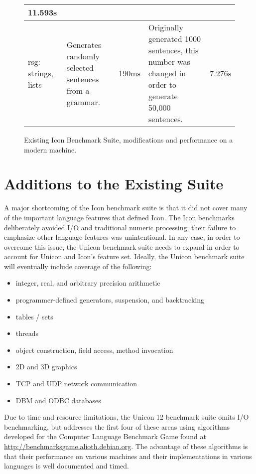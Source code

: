 \documentclass[letterpaper,12pt]{article}
\newcommand{\squeezeup}{\vspace{-1em}}
\begin{document}
\begin{figure}[h]
\begin{center}
{\begin{tabular}{ | p{2cm} | p{4cm} | p{.8cm} | p{5cm} | p{1.5cm} |}
        11.593s
        \\ \hline
        rsg: strings, lists &  
        Generates randomly selected sentences from a grammar. \cite{griswold:newsletter} & 
        190ms & 
        Originally generated 1000 sentences, this number 
        was changed in order to generate 50,000 sentences. & 
        7.276s 
        \\ \hline
      \end{tabular}
    \squeezeup
    }
  \end{center}
  \caption{Existing Icon Benchmark Suite, modifications and
    performance on a modern machine.}
  \label{fig1}
\end{figure}

\section{Additions to the Existing Suite}

A major shortcoming of the Icon benchmark suite is that it did not
cover many of the important language features that defined Icon.
The Icon benchmarks deliberately avoided I/O and traditional numeric
processing; their failure to emphasize other language features was
unintentional. In any case, in order to overcome this issue, the
Unicon benchmark suite needs to expand in order to account for 
Unicon and Icon's feature set. Ideally, the Unicon benchmark suite 
will eventually include coverage of the following:

  \squeezeup
\begin{itemize}[noitemsep]
  \renewcommand{\labelitemi}{$\circ$}
\item integer, real, and arbitrary precision arithmetic
\item programmer-defined generators, suspension, and backtracking
\item tables / sets
\item threads
\item object construction, field access, method invocation
\item 2D and 3D graphics
\item TCP and UDP network communication
\item DBM and ODBC databases
\end{itemize}  
  \squeezeup

Due to time and resource limitations, the Unicon 12 benchmark suite
omits I/O benchmarking, but addresses the first four of these areas 
using algorithms developed for the Computer Language Benchmark Game 
found at \url{http://benchmarksgame.alioth.debian.org}. 
The advantage of these algorithms is that their performance on various 
machines and their implementations in various languages is well documented 
and timed. 
\end{document}
